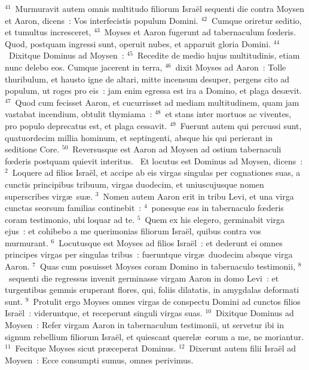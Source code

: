 ${}^{41}$~Murmuravit autem omnis multitudo filiorum Isra\"el sequenti die contra Moysen et Aaron, dicens~: Vos interfecistis populum Domini.
${}^{42}$~Cumque oriretur seditio, et tumultus incresceret,
${}^{43}$~Moyses et Aaron fugerunt ad tabernaculum fœderis. Quod, postquam ingressi sunt, operuit nubes, et apparuit gloria Domini.
${}^{44}$~Dixitque Dominus ad Moysen~:
${}^{45}$~Recedite de medio hujus multitudinis, etiam nunc delebo eos. Cumque jacerent in terra,
${}^{46}$~dixit Moyses ad Aaron~: Tolle thuribulum, et hausto igne de altari, mitte incensum desuper, pergens cito ad populum, ut roges pro eis~: jam enim egressa est ira a Domino, et plaga des\ae vit.
${}^{47}$~Quod cum fecisset Aaron, et cucurrisset ad mediam multitudinem, quam jam vastabat incendium, obtulit thymiama~:
${}^{48}$~et stans inter mortuos ac viventes, pro populo deprecatus est, et plaga cessavit.
${}^{49}$~Fuerunt autem qui percussi sunt, quatuordecim millia hominum, et septingenti, absque his qui perierant in seditione Core.
${}^{50}$~Reversusque est Aaron ad Moysen ad ostium tabernaculi fœderis postquam quievit interitus.
~\lettrine[lines=10,image=true,loversize=0.05,lraise=-0.03]{E}{}t locutus est Dominus ad Moysen, dicens~:
${}^{2}$~Loquere ad filios Isra\"el, et accipe ab eis virgas singulas per cognationes suas, a cunctis principibus tribuum, virgas duodecim, et uniuscujusque nomen superscribes virg\ae\ su\ae .
${}^{3}$~Nomen autem Aaron erit in tribu Levi, et una virga cunctas seorsum familias continebit~:
${}^{4}$~ponesque eas in tabernaculo fœderis coram testimonio, ubi loquar ad te.
${}^{5}$~Quem ex his elegero, germinabit virga ejus~: et cohibebo a me querimonias filiorum Isra\"el, quibus contra vos murmurant.
${}^{6}$~Locutusque est Moyses ad filios Isra\"el~: et dederunt ei omnes principes virgas per singulas tribus~: fueruntque virg\ae\ duodecim absque virga Aaron.
${}^{7}$~Quas cum posuisset Moyses coram Domino in tabernaculo testimonii,
${}^{8}$~sequenti die regressus invenit germinasse virgam Aaron in domo Levi~: et turgentibus gemmis eruperant flores, qui, foliis dilatatis, in amygdalas deformati sunt.
${}^{9}$~Protulit ergo Moyses omnes virgas de conspectu Domini ad cunctos filios Isra\"el~: videruntque, et receperunt singuli virgas suas.
${}^{10}$~Dixitque Dominus ad Moysen~: Refer virgam Aaron in tabernaculum testimonii, ut servetur ibi in signum rebellium filiorum Isra\"el, et quiescant querel\ae\ eorum a me, ne moriantur.
${}^{11}$~Fecitque Moyses sicut pr\ae ceperat Dominus.
${}^{12}$~Dixerunt autem filii Isra\"el ad Moysen~: Ecce consumpti sumus, omnes perivimus.
